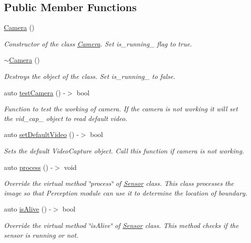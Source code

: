 \subsection*{Public Member Functions}
\begin{DoxyCompactItemize}
\item 
\hyperlink{class_camera_a01f94c3543f56ede7af49dc778f19331}{Camera} ()
\begin{DoxyCompactList}\small\item\em Constructor of the class \hyperlink{class_camera}{Camera}. Set is\+\_\+running\+\_\+ flag to true. \end{DoxyCompactList}\item 
\hyperlink{class_camera_ad1897942d0ccf91052386388a497349f}{$\sim$\+Camera} ()
\begin{DoxyCompactList}\small\item\em Destroys the object of the class. Set is\+\_\+running\+\_\+ to false. \end{DoxyCompactList}\item 
auto \hyperlink{class_camera_a467955a89a912bfcae67ee0905a8cd86}{test\+Camera} () -\/$>$ bool
\begin{DoxyCompactList}\small\item\em Function to test the working of camera. If the camera is not working it will set the vid\+\_\+cap\+\_\+ object to read default video. \end{DoxyCompactList}\item 
auto \hyperlink{class_camera_ad9cc807466f09917e7f62d0d6c2e5b46}{set\+Default\+Video} () -\/$>$ bool
\begin{DoxyCompactList}\small\item\em Sets the default Video\+Capture object. Call this function if camera is not working. \end{DoxyCompactList}\item 
auto \hyperlink{class_camera_a3af312509cb2a7167ad0dc6280cd9207}{process} () -\/$>$ void
\begin{DoxyCompactList}\small\item\em Override the virtual method \char`\"{}process\char`\"{} of \hyperlink{class_sensor}{Sensor} class. This class processes the image so that Perception module can use it to determine the location of boundary. \end{DoxyCompactList}\item 
auto \hyperlink{class_camera_a1b3b1ece3344ea84754aff31f048d55e}{is\+Alive} () -\/$>$ bool
\begin{DoxyCompactList}\small\item\em Override the virtual method \char`\"{}is\+Alive\char`\"{} of \hyperlink{class_sensor}{Sensor} class. This method checks if the sensor is running or not. \end{DoxyCompactList}\item 

\end{DoxyCompactItemize}
